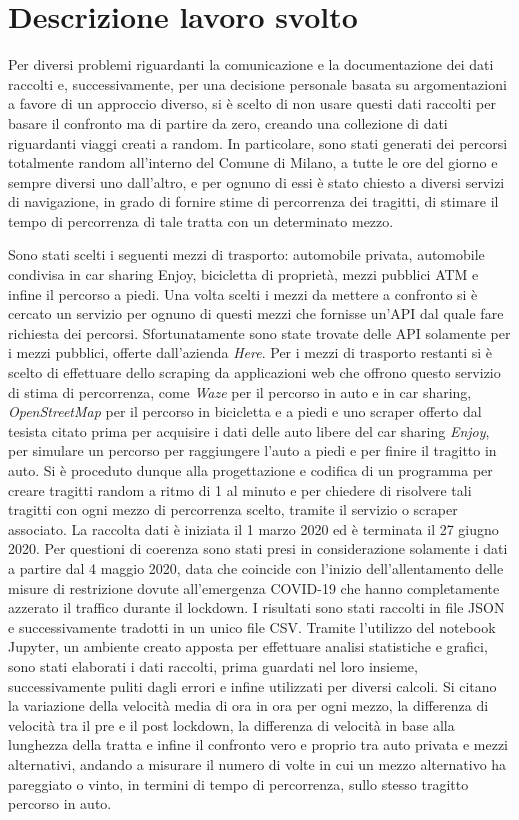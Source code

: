 \documentclass[a4paper,11pt]{article}
\begin{document}
\section{Descrizione lavoro svolto}

\large{
Per diversi problemi riguardanti la comunicazione e la documentazione dei dati raccolti e, successivamente, per una decisione personale basata su argomentazioni a favore di un approccio diverso, si è scelto di non usare questi dati raccolti per basare il confronto ma di partire da zero, creando una collezione di dati riguardanti viaggi creati a random. In particolare, sono stati generati dei percorsi totalmente random all'interno del Comune di Milano, a tutte le ore del giorno e sempre diversi uno dall'altro, e per ognuno di essi è stato chiesto a diversi servizi di navigazione, in grado di fornire stime di percorrenza dei tragitti, di stimare il tempo di percorrenza di tale tratta con un determinato mezzo.

Sono stati scelti i seguenti mezzi di trasporto: automobile privata, automobile condivisa in car sharing Enjoy, bicicletta di proprietà, mezzi pubblici ATM e infine il percorso a piedi. Una volta scelti i mezzi da mettere a confronto si è cercato un servizio per ognuno di questi mezzi che fornisse un'API dal quale fare richiesta dei percorsi. Sfortunatamente sono state trovate delle API solamente per i mezzi pubblici, offerte dall'azienda \textit{Here}. Per i mezzi di trasporto restanti si è scelto di effettuare dello scraping da applicazioni web che offrono questo servizio di stima di percorrenza, come \textit{Waze} per il percorso in auto e in car sharing, \textit{OpenStreetMap} per il percorso in bicicletta e a piedi e uno scraper offerto dal tesista citato prima per acquisire i dati delle auto libere del car sharing \textit{Enjoy}, per simulare un percorso per raggiungere l'auto a piedi e per finire il tragitto in auto. Si è proceduto dunque alla progettazione e codifica di un programma per creare tragitti random a ritmo di 1 al minuto e per chiedere di risolvere tali tragitti con ogni mezzo di percorrenza scelto, tramite il servizio o scraper associato. La raccolta dati è iniziata il 1 marzo 2020 ed è terminata il 27 giugno 2020. Per questioni di coerenza sono stati presi in considerazione solamente i dati a partire dal 4 maggio 2020, data che coincide con l'inizio dell'allentamento delle misure di restrizione dovute all'emergenza COVID-19 che hanno completamente azzerato il traffico durante il lockdown. I risultati sono stati raccolti in file JSON e successivamente tradotti in un unico file CSV. Tramite l'utilizzo del notebook Jupyter, un ambiente creato apposta per effettuare analisi statistiche e grafici, sono stati elaborati i dati raccolti, prima guardati nel loro insieme, successivamente puliti dagli errori e infine utilizzati per diversi calcoli. Si citano la variazione della velocità media di ora in ora per ogni mezzo, la differenza di velocità tra il pre e il post lockdown, la differenza di velocità in base alla lunghezza della tratta e infine il confronto vero e proprio tra auto privata e mezzi alternativi, andando a misurare il numero di volte in cui un mezzo alternativo ha pareggiato o vinto, in termini di tempo di percorrenza, sullo stesso tragitto percorso in auto.
}
\end{document}
